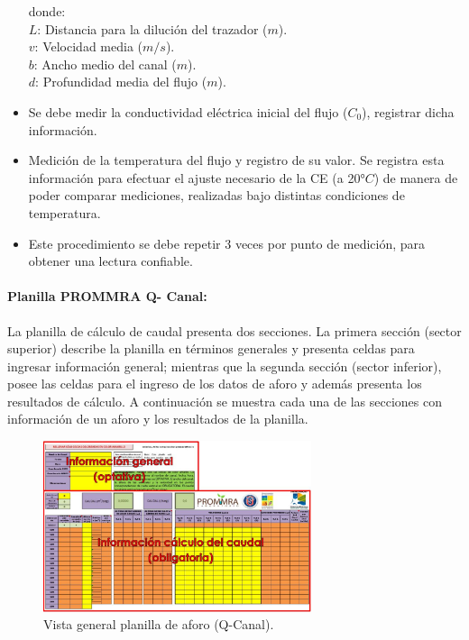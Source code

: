 \documentclass[]{article}
\begin{document}
\begin{itemize}
donde:\\
\(L\): Distancia para la dilución del trazador ($m$).\\
\(v\): Velocidad media ($m/s$).\\
\(b\): Ancho medio del canal ($m$).\\
\(d\): Profundidad media del flujo ($m$).\\
\item Se debe medir la conductividad eléctrica inicial del flujo ($C_0$), registrar dicha información.
\item Medición de la temperatura del flujo y registro de su valor. Se registra esta información para efectuar el ajuste necesario de la CE (a 20°$C$) de manera de poder comparar mediciones, realizadas bajo distintas condiciones de temperatura.
\item Este procedimiento se debe repetir 3 veces por punto de medición, para obtener una lectura confiable.
\end{itemize}

\paragraph{Planilla PROMMRA Q- Canal:}

La planilla de cálculo de caudal presenta dos secciones. La primera sección (sector superior) describe la planilla en términos generales y presenta celdas para ingresar información general; mientras que la segunda sección (sector inferior), posee las celdas para el ingreso de los datos de aforo y además presenta los resultados de cálculo. A continuación se muestra cada una de las secciones con información de un aforo y los resultados de la planilla.

\begin{figure}[H]
\centering
\includegraphics[width=0.7\textwidth]{images/planilla_qcanal.eps}
\caption{Vista general planilla de aforo (Q-Canal).}
\label{q_canal}
\end{figure}
\end{document}
